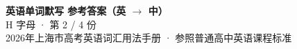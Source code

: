 \documentclass[10pt,a4paper]{article}
\begin{document}
\pagestyle{plain}

\begin{center}
{\LARGE\bfseries 英语单词默写 \quad 参考答案（英 $\to$ 中）}\\[0.22em]
{\large H 字母 · 第 2 / 4 份}\\[0.18em]
{\small 2026年上海市高考英语词汇用法手册 · 参照普通高中英语课程标准}
\end{center}

\vspace{0.2em}
\noindent{\color{rulegray}\rule{\textwidth}{0.8pt}}

\vspace{0.35em}

\vspace{0.25em}
\renewcommand{\arraystretch}{1.32}
\end{document}

